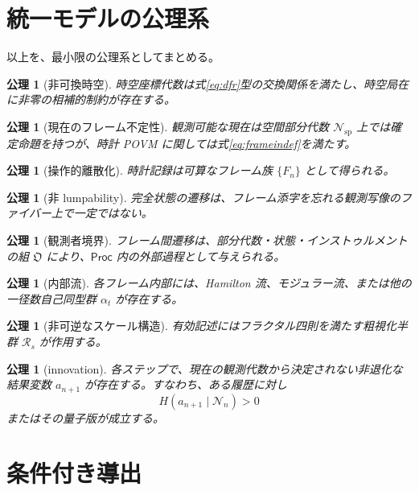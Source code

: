 \documentclass[a4paper,11pt]{ltjsarticle}
\newtheorem{axiom}[definition]{公理}
\theoremstyle{remark}
\newcommand{\N}{\mathcal{N}}
\newcommand{\Proc}{\mathsf{Proc}}
\begin{document}
\section{統一モデルの公理系}

以上を、最小限の公理系としてまとめる。

\begin{axiom}[非可換時空]
時空座標代数は式\eqref{eq:dfr}型の交換関係を満たし、時空局在に非零の相補的制約が存在する。
\end{axiom}

\begin{axiom}[現在のフレーム不定性]
観測可能な現在は空間部分代数 $\N_{\mathrm{sp}}$ 上では確定命題を持つが、時計 POVM に関しては式\eqref{eq:frameindef}を満たす。
\end{axiom}

\begin{axiom}[操作的離散化]
時計記録は可算なフレーム族 $\{F_n\}$ として得られる。
\end{axiom}

\begin{axiom}[非 lumpability]
完全状態の遷移は、フレーム添字を忘れる観測写像のファイバー上で一定ではない。
\end{axiom}

\begin{axiom}[観測者境界]
フレーム間遷移は、部分代数・状態・インストゥルメントの組 $\mathfrak O$ により、$\Proc$ 内の外部過程として与えられる。
\end{axiom}

\begin{axiom}[内部流]
各フレーム内部には、Hamilton 流、モジュラー流、または他の一径数自己同型群 $\alpha_t$ が存在する。
\end{axiom}

\begin{axiom}[非可逆なスケール構造]
有効記述にはフラクタル四則を満たす粗視化半群 $\mathcal R_s$ が作用する。
\end{axiom}

\begin{axiom}[innovation]
各ステップで、現在の観測代数から決定されない非退化な結果変数 $a_{n+1}$ が存在する。すなわち、ある履歴に対し
\begin{equation}
 H(a_{n+1}\mid\N_n)>0
\end{equation}
またはその量子版が成立する。
\end{axiom}

\section{条件付き導出}
\end{document}

